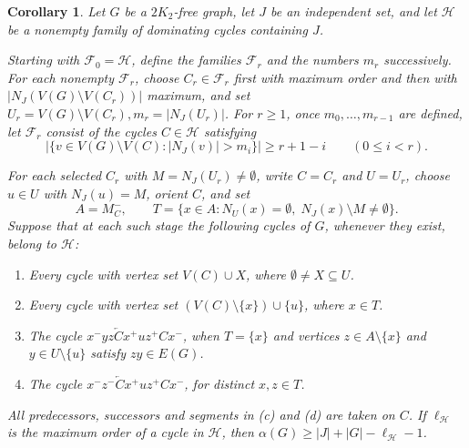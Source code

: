 \documentclass[11pt]{article}
\numberwithin{equation}{section}
\newtheorem{corollary}[theorem]{Corollary}
\theoremstyle{plain}
\theoremstyle{definition}
\theoremstyle{plain}
\begin{document}
\begin{corollary}\label{claim:cycle-restricted}
Let $G$ be a $2K_2$-free graph, let $J$ be an independent set,
and let $\mathcal H$ be a nonempty family of dominating cycles
containing $J$.

Starting with $\mathcal F_0=\mathcal H$, define the families
$\mathcal F_r$ and the numbers $m_r$ successively.
For each nonempty $\mathcal F_r$, choose $C_r\in\mathcal F_r$
first with maximum order and then with
$|N_J(V(G)\setminus V(C_r))|$ maximum, and set
 $U_r=V(G)\setminus V(C_r), m_r=|N_J(U_r)|$.
For $r\ge1$, once $m_0,\ldots,m_{r-1}$ are defined,
let $\mathcal F_r$ consist of the cycles $C\in\mathcal H$ satisfying
\[
 \bigl|\{v\in V(G)\setminus V(C):|N_J(v)|>m_i\}\bigr|
 \ge r+1-i\qquad(0\le i<r).
\]

For each selected $C_r$ with $M=N_J(U_r)\ne\emptyset$,
write $C=C_r$ and $U=U_r$, choose $u\in U$ with $N_J(u)=M$,
orient $C$, and set
\[
 A=M_C^-,\qquad
 T=\{x\in A:N_U(x)=\emptyset,\;N_J(x)\setminus M\ne\emptyset\}.
\]
Suppose that at each such stage the following cycles of $G$,
whenever they exist, belong to $\mathcal H$:
\begin{enumerate}[nosep]
\item[(a)] Every cycle with vertex set $V(C)\cup X$, where
$\emptyset\ne X\subseteq U$.

\item[(b)] Every cycle with vertex set
$(V(C)\setminus\{x\})\cup\{u\}$, where $x\in T$.

\item[(c)] The cycle
 $x^-yz\overleftarrow{C}x^+uz^+Cx^-$,
when $T=\{x\}$ and vertices $z\in A\setminus\{x\}$ and
$y\in U\setminus\{u\}$ satisfy $zy\in E(G)$.

\item[(d)] The cycle
$ x^-z^-\overleftarrow{C}x^+uz^+Cx^-$,
for distinct $x,z\in T$.
\end{enumerate}
All predecessors, successors and segments in (c) and (d) are taken
on $C$. If $\ell_{\mathcal H}$ is the maximum order of a cycle in
$\mathcal H$, then
 $\alpha(G)\ge |J|+|G|-\ell_{\mathcal H}-1$.
\end{corollary}
\end{document}
